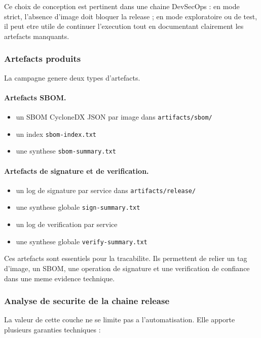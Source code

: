 Ce choix de conception est pertinent dans une chaine DevSecOps : en mode strict, l'absence d'image doit bloquer la release ; en mode exploratoire ou de test, il peut etre utile de continuer l'execution tout en documentant clairement les artefacts manquants.

\subsubsection{Artefacts produits}

La campagne genere deux types d'artefacts.

\paragraph{Artefacts SBOM.}

\begin{itemize}
  \item un SBOM CycloneDX JSON par image dans \texttt{artifacts/sbom/}
  \item un index \texttt{sbom-index.txt}
  \item une synthese \texttt{sbom-summary.txt}
\end{itemize}

\paragraph{Artefacts de signature et de verification.}

\begin{itemize}
  \item un log de signature par service dans \texttt{artifacts/release/}
  \item une synthese globale \texttt{sign-summary.txt}
  \item un log de verification par service
  \item une synthese globale \texttt{verify-summary.txt}
\end{itemize}

Ces artefacts sont essentiels pour la tracabilite. Ils permettent de relier un tag d'image, un SBOM, une operation de signature et une verification de confiance dans une meme evidence technique.

\subsubsection{Analyse de securite de la chaine release}

La valeur de cette couche ne se limite pas a l'automatisation. Elle apporte plusieurs garanties techniques :

